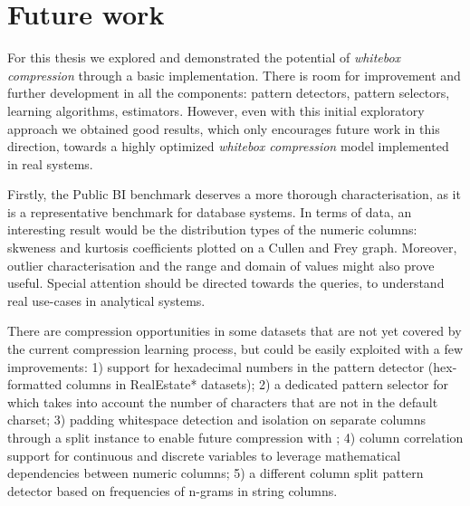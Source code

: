 \section{Future work}

For this thesis we explored and demonstrated the potential of \textit{whitebox compression} through a basic implementation. There is room for improvement and further development in all the components: pattern detectors, pattern selectors, learning algorithms, estimators. However, even with this initial exploratory approach we obtained good results, which only encourages future work in this direction, towards a highly optimized \textit{whitebox compression} model implemented in real systems.

Firstly, the Public BI benchmark deserves a more thorough characterisation, as it is a representative benchmark for database systems. In terms of data, an interesting result would be the distribution types of the numeric columns: skweness and kurtosis coefficients plotted on a Cullen and Frey graph. Moreover, outlier characterisation and the range and domain of values might also prove useful. Special attention should be directed towards the queries, to understand real use-cases in analytical systems.

There are compression opportunities in some datasets that are not yet covered by the current compression learning process, but could be easily exploited with a few improvements: 1) support for hexadecimal numbers in the  pattern detector (hex-formatted columns in RealEstate* datasets); 2) a dedicated pattern selector for  which takes into account the number of characters that are not in the default charset; 3) padding whitespace detection and isolation on separate columns through a split instance to enable future compression with ; 4) column correlation support for continuous and discrete variables to leverage mathematical dependencies between numeric columns; 5) a different column split pattern detector based on frequencies of n-grams in string columns.

